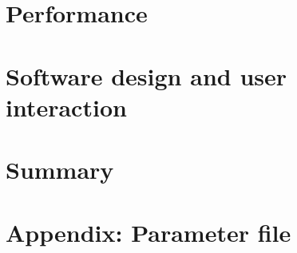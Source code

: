 \documentclass[%
aip,
superscriptaddress,
 amsmath,amssymb,
preprint,%
]{revtex4-2}
\begin{document}
\section{\label{sec:level5}Performance}



\section{\label{sec:level6}Software design and user interaction}







\section{\label{sec:level7}Summary}


\section{Appendix: Parameter file}




\end{document}
